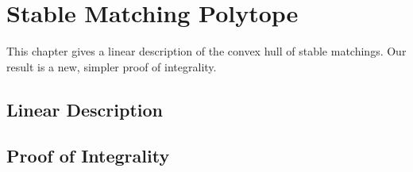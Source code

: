 \chapter{Stable Matching Polytope}
This chapter gives a linear description of the convex hull of stable matchings. Our result is a new, simpler proof of integrality.
\section{Linear Description}

\section{Proof of Integrality}
